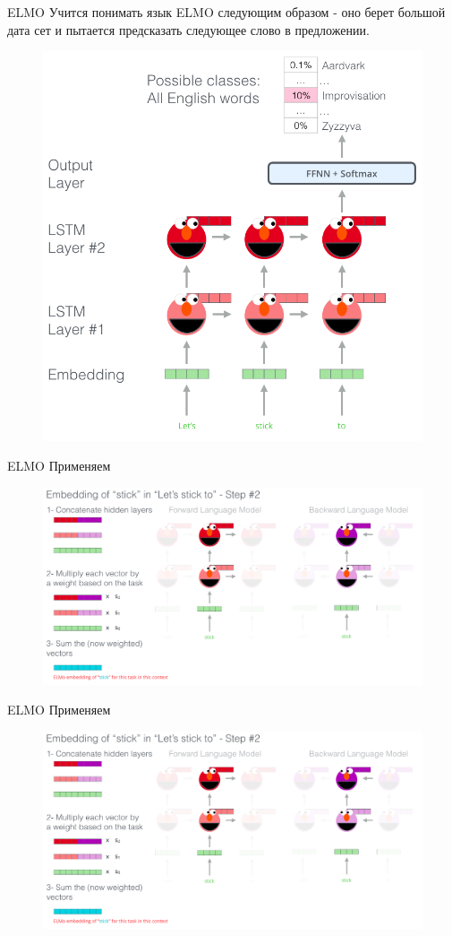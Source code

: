 \documentclass[notes,12pt, aspectratio=169]{beamer}
\begin{document}
\begin{frame}{ELMO}
	Учится понимать язык ELMO следующим образом - оно берет большой дата сет и пытается предсказать следующее слово в предложении.	
	\begin{figure}
		\centering
		\includegraphics[width=0.4\linewidth]{images/Bert-language-modeling}
		\label{fig:seq2seq}
	\end{figure}
\end{frame}

\begin{frame}{ELMO}
	Применяем	
	\begin{figure}
		\centering
		\includegraphics[width=0.75\linewidth]{images/elmo-embedding}
		\label{fig:seq2seq}
	\end{figure}
\end{frame}


\begin{frame}{ELMO}
	Применяем	
	\begin{figure}
		\centering
		\includegraphics[width=0.75\linewidth]{images/elmo-embedding}
		\label{fig:seq2seq}
	\end{figure}
\end{frame}
\end{document}
